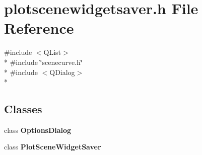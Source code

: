 \section{plotscenewidgetsaver.\+h File Reference}
\label{bk3_2plotsaver_2plotscenewidgetsaver_8h}
{\ttfamily \#include $<$Q\+List$>$}\\*
{\ttfamily \#include \char`\"{}scenecurve.\+h\char`\"{}}\\*
{\ttfamily \#include $<$Q\+Dialog$>$}\\*
\subsection*{Classes}
\begin{DoxyCompactItemize}
\item 
class {\bf Options\+Dialog}
\item 
class {\bf Plot\+Scene\+Widget\+Saver}
\end{DoxyCompactItemize}

